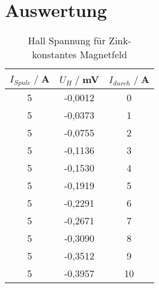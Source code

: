 \newpage
\section{Auswertung}










\begin{table}
    \centering
    \begin{tabular}{c c c}
        \toprule
        $I_{Spule} \;/\;$A & $U_H\;/\;$mV & $I_{durch} \;/\;$A\\
        \midrule
            5                   &-0,0012&             0\\
            5                   &-0,0373&             1\\
            5                   &-0,0755&             2\\
            5                   &-0,1136&             3\\
            5                   &-0,1530&             4\\
            5                   &-0,1919&             5\\
            5                   &-0,2291&             6\\
            5                   &-0,2671&             7\\
            5                   &-0,3090&             8\\
            5                   &-0,3512&             9\\
            5                   &-0,3957&             10\\
        \bottomrule
    \end{tabular}
    \caption{Hall Spannung für Zink- konstantes Magnetfeld}
    \label{tab:Zn_B}
\end{table}


